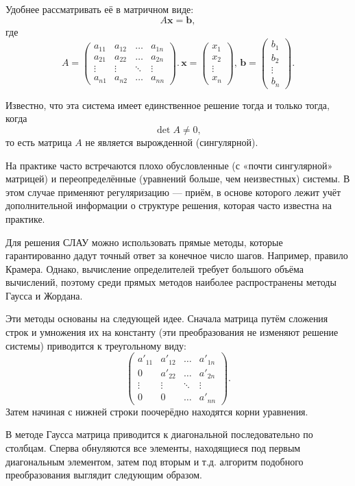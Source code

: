Удобнее рассматривать её в матричном виде:
\[
A\mathbf{x}=\mathbf{b},
\]
где 
\[
A=\begin{pmatrix}a_{11} & a_{12} & \dots & a_{1n}\\
a_{21} & a_{22} & \dots & a_{2n}\\
\vdots & \vdots & \ddots & \vdots\\
a_{n1} & a_{n2} & \ldots & a_{nn}
\end{pmatrix}.\,\mathbf{x}=\begin{pmatrix}x_{1}\\
x_{2}\\
\vdots\\
x_{n}
\end{pmatrix},\,\mathbf{b}=\begin{pmatrix}b_{1}\\
b_{2}\\
\vdots\\
b_{n}
\end{pmatrix}.
\]


Известно, что эта система имеет единственное решение тогда и только
тогда, когда
\[
\det A\neq0,
\]
то есть матрица $A$ не является вырожденной (сингулярной).

На практике часто встречаются плохо обусловленные (с «почти сингулярной»
матрицей) и переопределённые (уравнений больше, чем неизвестных) системы.
В этом случае применяют регуляризацию — приём, в основе которого лежит
учёт дополнительной информации о структуре решения, которая часто
известна на практике.

Для решения СЛАУ можно использовать прямые методы, которые гарантированно
дадут точный ответ за конечное число шагов. Например, правило Крамера.
Однако, вычисление определителей требует большого объёма вычислений,
поэтому среди прямых методов наиболее распространены методы Гаусса
и Жордана.

Эти методы основаны на следующей идее. Сначала матрица путём сложения
строк и умножения их на константу (эти преобразования не изменяют
решение системы) приводится к треугольному виду:
\[
\begin{pmatrix}a'_{11} & a'_{12} & \dots & a'_{1n}\\
0 & a'_{22} & \dots & a'_{2n}\\
\vdots & \vdots & \ddots & \vdots\\
0 & 0 & \ldots & a'_{nn}
\end{pmatrix}.
\]
Затем начиная с нижней строки поочерёдно находятся корни уравнения.

В методе Гаусса матрица приводится к диагональной последовательно
по столбцам. Сперва обнуляются все элементы, находящиеся под первым
диагональным элементом, затем под вторым и т.д. алгоритм подобного
преобразования выглядит следующим образом.

